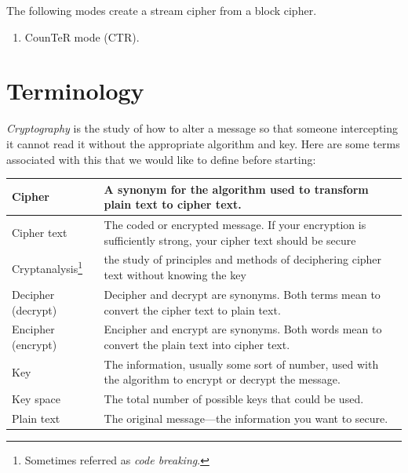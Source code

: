 \documentclass[a4paper, 12pt]{book} %
\begin{document}
The following modes create a stream cipher from a block cipher. 
\begin{enumerate}
    \item CounTeR mode (CTR).
\end{enumerate}








\section{Terminology}
\emph{Cryptography} is the study of how to alter a message so that someone intercepting it cannot read it without the appropriate algorithm and key. Here are some terms associated with this that we would like to define before starting:
\begin{longtable}{|l|p{10cm}|} \hline 
    Cipher & A synonym for the algorithm used to transform plain text to cipher text. \\  \hline 
    Cipher text & The coded or encrypted message. If your encryption is sufficiently strong, your cipher text should be secure  \\ \hline 
    Cryptanalysis\footnote{Sometimes referred as \emph{code breaking}.} & the study of principles and methods of deciphering cipher text without knowing the key \\ \hline 
    Decipher (decrypt) & Decipher and decrypt are synonyms. Both terms mean to convert the cipher text to plain text. \\ \hline 
    Encipher (encrypt) &  Encipher and encrypt are synonyms. Both words mean to convert the plain text into cipher text. \\ \hline 
    Key & The information, usually some sort of number, used with the algorithm to encrypt or decrypt the message.  \\ \hline 
    Key space  & The total number of possible keys that could be used. \\ \hline 
    Plain text & The original message—the information you want to secure. \\ \hline 
\end{longtable}
\end{document}
